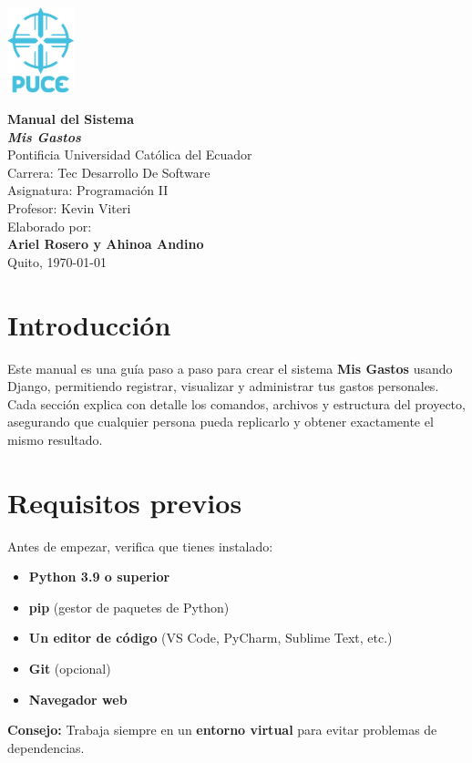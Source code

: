 \documentclass[12pt,a4paper]{article}
\begin{document}
\begin{titlepage}
\begin{flushright}   
 \vspace*{-2cm}
 \includegraphics[height=2.5cm]{Imagenes/logo puce.png} 
\end{flushright}
 \centering
 \vspace*{1cm}
 {\Huge\bfseries Manual del Sistema\\[1.5ex] \textit{Mis Gastos}}\\[2cm]
 {\Large Pontificia Universidad Católica del Ecuador}\\[1cm]
 {\large Carrera: Tec Desarrollo De Software}\\[0.5cm]
 {\large Asignatura: Programación II}\\[0.5cm]
 {\large Profesor: Kevin Viteri}\\[1cm]
 {\large Elaborado por:}\\[0.3cm]
 {\bfseries Ariel Rosero y Ahinoa Andino}\\[2cm]
 {\large Quito, \today}
 \vfill
\end{titlepage}

\tableofcontents
\newpage

\section{Introducción}
Este manual es una guía paso a paso para crear el sistema \textbf{Mis Gastos} usando Django, permitiendo registrar, visualizar y administrar tus gastos personales. Cada sección explica con detalle los comandos, archivos y estructura del proyecto, asegurando que cualquier persona pueda replicarlo y obtener exactamente el mismo resultado.

\section{Requisitos previos}
Antes de empezar, verifica que tienes instalado:
\begin{itemize}
    \item \textbf{Python 3.9 o superior}
    \item \textbf{pip} (gestor de paquetes de Python)
    \item \textbf{Un editor de código} (VS Code, PyCharm, Sublime Text, etc.)
    \item \textbf{Git} (opcional)
    \item \textbf{Navegador web}
\end{itemize}
\textbf{Consejo:} Trabaja siempre en un \textbf{entorno virtual} para evitar problemas de dependencias.
\end{document}
